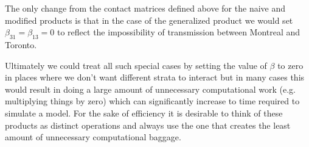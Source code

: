 \FloatBarrier


The only change from the contact matrices defined above for the naive and modified products is that in the case of the generalized product we would set $\beta_{31} = \beta_{13} = 0$ to reflect the impossibility of transmission between Montreal and Toronto.

Ultimately we could treat all such special cases by setting the value of $\beta$ to zero in places where we don't want different strata to interact but in many cases this would result in doing a large amount of unnecessary computational work (e.g. multiplying things by zero) which can significantly increase to time required to simulate a model. For the sake of efficiency it is desirable to think of these products as distinct operations and always use the one that creates the least amount of unnecessary computational baggage. 


